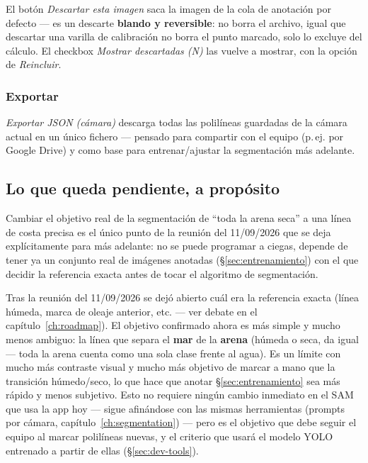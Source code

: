 El botón \textit{Descartar esta imagen} saca la imagen de la cola de anotación por defecto — es
un descarte \textbf{blando y reversible}: no borra el archivo, igual que descartar una varilla de
calibración no borra el punto marcado, solo lo excluye del cálculo. El checkbox \textit{Mostrar
descartadas (N)} las vuelve a mostrar, con la opción de \textit{Reincluir}.

\subsubsection{Exportar}

\textit{Exportar JSON (cámara)} descarga todas las polilíneas guardadas de la cámara actual en un
único fichero — pensado para compartir con el equipo (p.\,ej. por Google Drive) y como base para
entrenar/ajustar la segmentación más adelante.

\subsection{Lo que queda pendiente, a propósito}
\label{sec:linea-humeda-pendiente}

Cambiar el objetivo real de la segmentación de ``toda la arena seca'' a una línea de costa
precisa es el único punto de la reunión del 11/09/2026 que se deja explícitamente para más
adelante: no se puede programar a ciegas, depende de tener ya un conjunto real de imágenes
anotadas (\S\ref{sec:entrenamiento}) con el que decidir la referencia exacta antes de tocar el
algoritmo de segmentación.

\begin{warnbox}
Tras la reunión del 11/09/2026 se dejó abierto cuál era la referencia exacta (línea húmeda,
marca de oleaje anterior, etc. — ver debate en el capítulo~\ref{ch:roadmap}). El objetivo
confirmado ahora es más simple y mucho menos ambiguo: la línea que separa el \textbf{mar} de la
\textbf{arena} (húmeda o seca, da igual — toda la arena cuenta como una sola clase frente al
agua). Es un límite con mucho más contraste visual y mucho más objetivo de marcar a mano que la
transición húmedo/seco, lo que hace que anotar \S\ref{sec:entrenamiento} sea más rápido y menos
subjetivo. Esto no requiere ningún cambio inmediato en el SAM que usa la app hoy — sigue
afinándose con las mismas herramientas (prompts por cámara, capítulo~\ref{ch:segmentation}) —
pero es el objetivo que debe seguir el equipo al marcar polilíneas nuevas, y el criterio que
usará el modelo YOLO entrenado a partir de ellas (\S\ref{sec:dev-tools}).
\end{warnbox}

